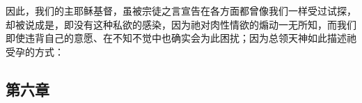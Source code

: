 \par

因此，我们的主耶稣基督，虽被宗徒之言宣告在各方面都曾像我们一样受过试探，却被说成是，即没有这种私欲的感染，因为祂对肉性情欲的煽动一无所知，而我们即使违背自己的意愿、在不知不觉中也确实会为此困扰；因为总领天神如此描述祂受孕的方式：\par


\subsection{第六章}

\par

